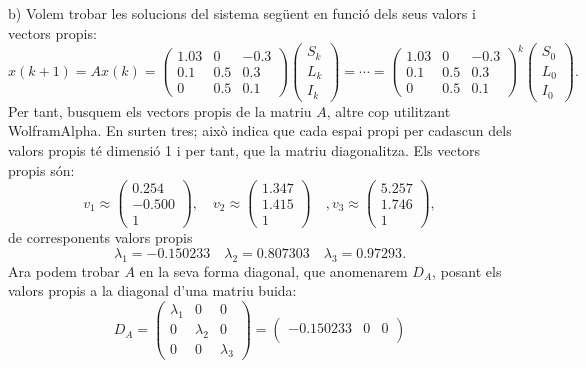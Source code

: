\documentclass[11pt]{article}
\begin{document}
\begin{legal}
\begin{legal}
$$	$$
	\item[b)] Volem trobar les solucions del sistema següent en funció dels seus valors i vectors propis:
	$$
	x(k+1)=Ax(k)=\begin{pmatrix}
	1.03 & 0 & -0.3\\
	0.1 & 0.5 & 0.3\\
	0 & 0.5 & 0.1
	\end{pmatrix}
	\begin{pmatrix}S_k\\ L_k\\ I_k\end{pmatrix}
	=\cdots=
	\begin{pmatrix}
	1.03 & 0 & -0.3\\
	0.1 & 0.5 & 0.3\\
	0 & 0.5 & 0.1
	\end{pmatrix}^k
	\begin{pmatrix}S_0\\ L_0\\ I_0\end{pmatrix}.
	$$
	Per tant, busquem els vectors propis de la matriu $A$, altre cop utilitzant WolframAlpha. En surten tres; això indica que cada espai propi per cadascun dels valors propis té dimensió 1 i per tant, que la matriu diagonalitza. Els vectors propis són:
	$$
	v_1\approx\begin{pmatrix}0.254\\ -0.500\\ 1\end{pmatrix},\quad v_2\approx\begin{pmatrix}1.347\\ 1.415\\ 1\end{pmatrix}\quad, v_3\approx\begin{pmatrix}5.257\\ 1.746\\ 1\end{pmatrix},
	$$
	de corresponents valors propis
	$$
	\lambda_1=-0.150233\quad \lambda_2=0.807303 \quad \lambda_3=0.97293.
	$$
	Ara podem trobar $A$ en la seva forma diagonal, que anomenarem $D_A$, posant els valors propis a la diagonal d'una matriu buida:
	$$
D_A=	\begin{pmatrix}
	\lambda_1 & 0 & 0\\
	0 & \lambda_2 & 0\\
	0 & 0 & \lambda_3
	\end{pmatrix}=\begin{pmatrix}
	-0.150233 & 0 & 0\\

\end{pmatrix}$$
\end{legal}
\end{legal}
\end{document}
